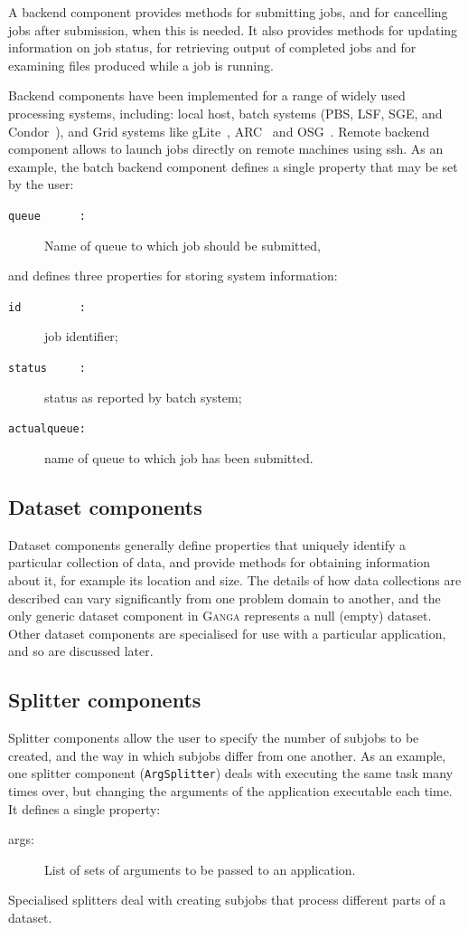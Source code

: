 \documentclass{elsart}
\def\ganga {\textsc{Ganga}\xspace}
\def\grid {Grid\xspace}
\newcommand{\code}[1]{\texttt{#1}}
\begin{document}
A backend component provides methods for submitting jobs, and for cancelling
jobs after submission, when this is needed.  It also provides methods for
updating information on job status, for retrieving output of completed jobs
and for examining files produced while a job is running.

Backend components have been implemented for a range of widely used
processing systems, including: local host, batch systems (PBS, LSF,
SGE, and Condor~\cite{Batch}), and \grid systems like
gLite~\cite{LCG}, ARC~\cite{NorduGrid} and OSG~\cite{OSG}. Remote
backend component allows to launch jobs directly on remote machines
using ssh.  As an example, the batch backend component defines a
single property that may be set by the user:
\begin{description}
\item[\code{queue~~~~~~:}] Name of queue to which job should be submitted,
\end{description}
and defines three properties for storing system information:
\begin{description}
\item[\code{id~~~~~~~~~:}] job identifier;
\item[\code{status~~~~~:}] status as reported by batch system;
\item[\code{actualqueue:}] name of queue to which job has been submitted.
\end{description}

\subsection{Dataset components}
Dataset components generally define properties that uniquely identify a
particular collection of data, and provide methods for obtaining information
about it, for example its location and size. The details of how data
collections are described can vary significantly from one problem domain to
another, and the only generic dataset component in \ganga represents a null
(empty) dataset.  Other dataset components are specialised for use with a
particular application, and so are discussed later.

\subsection{Splitter components}
Splitter components allow the user to specify the number of subjobs to be
created, and the way in which subjobs differ from one another. As an example,
one splitter component (\code{ArgSplitter}) deals with executing the same task
many times over, but changing the arguments of the application executable each
time. It defines a single property:
\begin{description}
\item[args:] List of sets of arguments to be passed to an application.
\end{description}
Specialised splitters deal with creating subjobs that process different parts
of a dataset.
\end{document}

